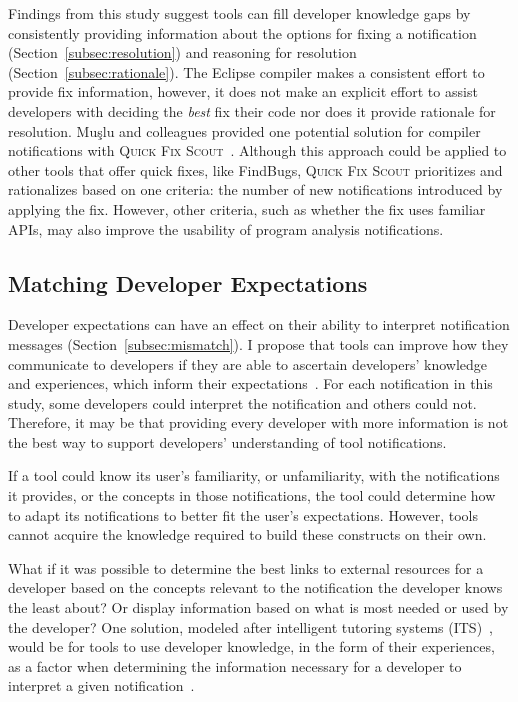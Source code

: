 Findings from this study suggest tools can fill developer knowledge gaps by consistently providing information about the options for fixing a notification (Section~\ref{subsec:resolution}) and reasoning for resolution (Section~\ref{subsec:rationale}). The Eclipse compiler makes a consistent effort to provide fix information, however, it does not make an explicit effort to assist developers with deciding the \textit{best} fix their code nor does it provide rationale for resolution. Mu{\c{s}}lu and colleagues provided one potential solution for compiler notifications with \textsc{Quick Fix Scout}~\cite{Mucslu:2012:Speculative}. Although this approach could be applied to other tools that offer quick fixes, like FindBugs, \textsc{Quick Fix Scout} prioritizes and rationalizes based on one criteria: the number of new notifications introduced by applying the fix. However, other criteria, 
such as whether the fix uses familiar APIs, may also improve the usability of program analysis notifications.


\subsection{Matching Developer Expectations}
Developer expectations can have an effect on their ability to interpret notification messages (Section~\ref{subsec:mismatch}). 
I propose that tools can improve how they communicate to developers if they are able to ascertain developers' knowledge and experiences, which inform their expectations~\cite{dean1982computer}.
For each notification in this study, some developers could interpret the notification and others could not. Therefore, it may be that providing every developer with more information is not the best way to support developers' understanding of tool notifications.

If a tool could know its user's familiarity, or unfamiliarity, with the notifications it provides, or the concepts in those notifications, the tool could determine how to adapt its notifications to better fit the user's expectations.
However, tools cannot acquire the knowledge required to build these constructs on their own. 

What if it was possible to determine the best links to external resources for a developer based on the concepts relevant to the notification the developer knows the least about?
Or display information based on what is most needed or used by the developer?
One solution, modeled after intelligent tutoring systems (ITS)~\cite{tutoringsys}, would be for tools to use developer knowledge, in the form of their experiences, as a factor when determining the information necessary for a developer to interpret a given notification~\cite{johnson2015bespoke}.

